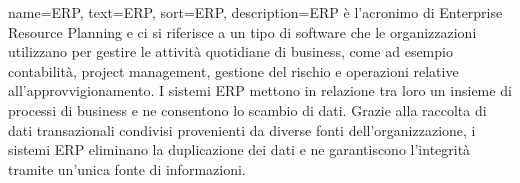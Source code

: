 {
    name={ERP},
    text=ERP,
    sort=ERP,
    description={ERP è l'acronimo di Enterprise Resource Planning e ci si riferisce a un tipo di software che le organizzazioni utilizzano per gestire le attività quotidiane di business, come ad esempio contabilità, project management, gestione del rischio e operazioni relative all'approvvigionamento. 
I sistemi ERP mettono in relazione tra loro un insieme di processi di business e ne consentono lo scambio di dati. Grazie alla raccolta di dati transazionali condivisi provenienti da diverse fonti dell'organizzazione, i sistemi ERP eliminano la duplicazione dei dati e ne garantiscono l'integrità tramite un'unica fonte di informazioni.}
}
